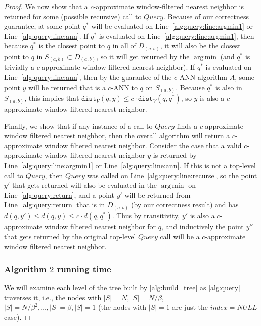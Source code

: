 \documentclass{article}
\theoremstyle{plain}
\theoremstyle{definition}
\theoremstyle{remark}
\DeclareMathOperator*{\argmin}{arg\,min}
\begin{document}
\begin{proof}
We now show that a $c$-approximate window-filtered nearest neighbor is returned for some (possible recursive) call to $Query$. Because of our correctness guarantee, at some point $q^*$ will be evaluated on Line~\ref{alg:query:line:argmin1} or Line~\ref{alg:query:line:ann}. If $q^*$ is evaluated on Line~\ref{alg:query:line:argmin1}, then because $q^*$ is the closest point to $q$ in all of $D_{(a, b)}$, it will also be the closest point to $q$ in $S_{(a, b)} \subset D_{(a, b)}$, so it will get returned by the $\argmin$ (and $q^*$ is trivially a $c$-approximate window filtered nearest neighbor). If $q^*$ is evaluated on Line~\ref{alg:query:line:ann}, then by the guarantee of the $c$-ANN algorithm $A$, some point $y$ will be returned that is a $c$-ANN to $q$ on $S_{(a, b)}$. Because $q^*$ is also in $S_{(a, b)}$, this implies that $\texttt{dist}_V(q, y) \le c \cdot \texttt{dist}_V(q, q^*)$, so $y$ is also a $c$-approximate window filtered nearest neighbor.

Finally, we show that if any instance of a call to $Query$ finds a $c$-approximate window filtered nearest neighbor, then the overall algorithm will return a $c$-approximate window filtered nearest neighbor. Consider the case that a valid $c$-approximate window filtered nearest neighbor $y$ is returned by Line~\ref{alg:query:line:argmin1} or Line~\ref{alg:query:line:ann}. If this is not a top-level call to $Query$, then $Query$ was called on Line~\ref{alg:query:line:recurse}, so the point $y'$ that gets returned will also be evaluated in the $\argmin$ on Line~\ref{alg:query:return}, and a point $y'$ will be returned from Line~\ref{alg:query:return} that is in $D_{(a, b)}$ (by our correctness result) and has $d(q, y') \le d(q, y) \le c \cdot d(q, q^*)$. Thus by transitivity, $y'$ is also a $c$-approximate window filtered nearest neighbor for $q$, and inductively the point $y''$ that gets returned by the original top-level $Query$ call will be a $c$-approximate window filtered nearest neighbor. 

\subsubsection*{Algorithm $2$ running time}

We will examine each level of the tree built by \cref{alg:build_tree} as \cref{alg:query} traverses it, i.e., the nodes with $|S| = N$, $|S| = N / \beta$, $|S| = N / \beta^2, \ldots, |S| = \beta, |S| = 1$ (the nodes with $|S| = 1$ are just the $index = NULL$ case). 


\end{proof}
\end{document}
